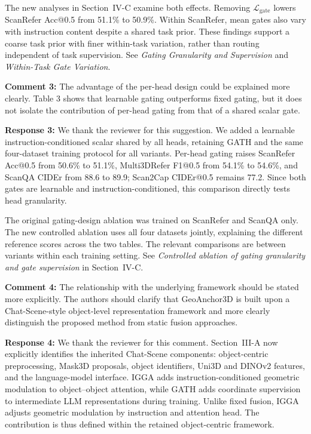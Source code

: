 The new analyses in Section~IV-C examine both effects. Removing $\mathcal{L}_{\mathrm{gate}}$ lowers ScanRefer Acc@0.5 from 51.1\% to 50.9\%. Within ScanRefer, mean gates also vary with instruction content despite a shared task prior. These findings support a coarse task prior with finer within-task variation, rather than routing independent of task supervision. See \textit{Gating Granularity and Supervision} and \textit{Within-Task Gate Variation}.
\vspace{\resafter}


{\noindent\color{comment}
\textbf{Comment 3:}
The advantage of the per-head design could be explained more clearly. Table 3 shows that learnable gating outperforms fixed gating, but it does not isolate the contribution of per-head gating from that of a shared scalar gate.
}\vspace{\comafter}

\noindent\textbf{Response 3:}
We thank the reviewer for this suggestion. We added a learnable instruction-conditioned scalar shared by all heads, retaining GATH and the same four-dataset training protocol for all variants. Per-head gating raises ScanRefer Acc@0.5 from 50.6\% to 51.1\%, Multi3DRefer F1@0.5 from 54.1\% to 54.6\%, and ScanQA CIDEr from 88.6 to 89.9; Scan2Cap CIDEr@0.5 remains 77.2. Since both gates are learnable and instruction-conditioned, this comparison directly tests head granularity.

The original gating-design ablation was trained on ScanRefer and ScanQA only. The new controlled ablation uses all four datasets jointly, explaining the different reference scores across the two tables. The relevant comparisons are between variants within each training setting. See \textit{Controlled ablation of gating granularity and gate supervision} in Section~IV-C.
\vspace{\resafter}


{\noindent\color{comment}
\textbf{Comment 4:}
The relationship with the underlying framework should be stated more explicitly. The authors should clarify that GeoAnchor3D is built upon a Chat-Scene-style object-level representation framework and more clearly distinguish the proposed method from static fusion approaches.
}\vspace{\comafter}

\noindent\textbf{Response 4:}
We thank the reviewer for this comment. Section~III-A now explicitly identifies the inherited Chat-Scene components: object-centric preprocessing, Mask3D proposals, object identifiers, Uni3D and DINOv2 features, and the language-model interface. IGGA adds instruction-conditioned geometric modulation to object--object attention, while GATH adds coordinate supervision to intermediate LLM representations during training. Unlike fixed fusion, IGGA adjusts geometric modulation by instruction and attention head. The contribution is thus defined within the retained object-centric framework.
\vspace{\resafter}


